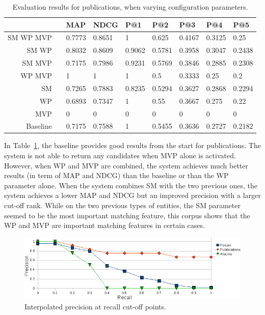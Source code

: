 \begin{table}[htb]
\centering
{}
\begin{tabular}{@{}rcl@{\hs}l@{\hs}l@{\hs}l@{\hs}l@{\hs}l@{\hs}l@{}}
\toprule
& \phantom{a} & MAP & NDCG & P@1 & P@2 & P@3 & P@4 & P@5 \\ 
\midrule

 SM WP MVP && 0.7773 & 0.8651 & 1 & 0.625 & 0.4167 & 0.3125 & 0.25 \\ %

 SM WP && 0.8032 & 0.8609 & 0.9062 & 0.5781 & 0.3958 & 0.3047 & 0.2438 \\ %

 SM MVP && 0.7175 & 0.7986 & 0.9231 & 0.5769 & 0.3846 & 0.2885 & 0.2308 \\ %

 WP MVP && 1 & 1 & 1 & 0.5 & 0.3333 & 0.25 & 0.2 \\ %

 SM && 0.7265 & 0.7883 & 0.8235 & 0.5294 & 0.3627 & 0.2868 & 0.2294 \\ %

 WP && 0.6893 & 0.7347 & 1 & 0.55 & 0.3667 & 0.275 & 0.22 \\ %

 MVP && 0 & 0 & 0 & 0 & 0 & 0 & 0 \\ %

 Baseline && 0.7175 & 0.7588 & 1 & 0.5455 & 0.3636 & 0.2727 & 0.2182 \\ %

\bottomrule
\end{tabular}
\caption{Evaluation results for publications, when varying configuration parameters.}
\label{tab:agreement-publications}
\end{table}

In Table~\ref{tab:agreement-publications}, the baseline provides good results from the start for publications. The system is not able to return any candidates when MVP alone is activated. However, when WP and MVP are combined, the system achieves much better results (in term of MAP and NDCG) than the baseline or than the WP parameter alone. When the system combines SM with the two previous ones, the system achieves a lower MAP and NDCG but an improved precision with a larger cut-off rank. While on the two previous types of entities, the SM parameter seemed to be the most important matching feature, this corpus shows that the WP and MVP are important matching features in certain cases.

\begin{figure}[htb]
 \includegraphics[width=\linewidth]{chapters/core/img/precrecal_wlabels.png}
\caption{Interpolated precision at recall cut-off points.}
\label{fig:precrecall}
\end{figure}

